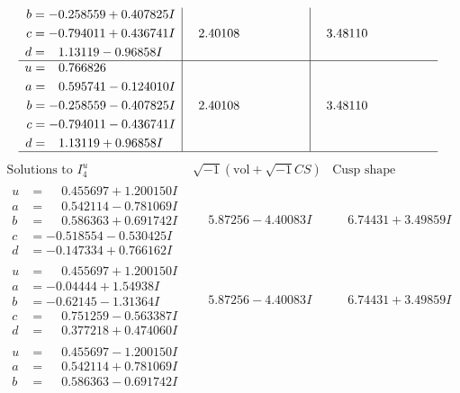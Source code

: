 \documentclass[1p]{elsarticle_modified}
\theoremstyle{definition}
\newcommand{\I}{\sqrt{-1}}
\begin{document}
$$\begin{array}{c|c|c}
\begin{aligned}
b &= -0.258559 + 0.407825 I \\
c &= -0.794011 + 0.436741 I \\
d &= \phantom{-}1.13119 - 0.96858 I\end{aligned}
 & \phantom{-}2.40108\phantom{ +0.000000I} & \phantom{-}3.48110\phantom{ +0.000000I} \\ \hline\begin{aligned}
u &= \phantom{-}0.766826\phantom{ +0.000000I} \\
a &= \phantom{-}0.595741 - 0.124010 I \\
b &= -0.258559 - 0.407825 I \\
c &= -0.794011 - 0.436741 I \\
d &= \phantom{-}1.13119 + 0.96858 I\end{aligned}
 & \phantom{-}2.40108\phantom{ +0.000000I} & \phantom{-}3.48110\phantom{ +0.000000I}\\
 \hline 
 \end{array}$$\newpage$$\begin{array}{c|c|c}  
\text{Solutions to }I^u_{4}& \I (\text{vol} + \sqrt{-1}CS) & \text{Cusp shape}\\
 \hline 
\begin{aligned}
u &= \phantom{-}0.455697 + 1.200150 I \\
a &= \phantom{-}0.542114 - 0.781069 I \\
b &= \phantom{-}0.586363 + 0.691742 I \\
c &= -0.518554 - 0.530425 I \\
d &= -0.147334 + 0.766162 I\end{aligned}
 & \phantom{-}5.87256 - 4.40083 I & \phantom{-}6.74431 + 3.49859 I \\ \hline\begin{aligned}
u &= \phantom{-}0.455697 + 1.200150 I \\
a &= -0.04444 + 1.54938 I \\
b &= -0.62145 - 1.31364 I \\
c &= \phantom{-}0.751259 - 0.563387 I \\
d &= \phantom{-}0.377218 + 0.474060 I\end{aligned}
 & \phantom{-}5.87256 - 4.40083 I & \phantom{-}6.74431 + 3.49859 I \\ \hline\begin{aligned}
u &= \phantom{-}0.455697 - 1.200150 I \\
a &= \phantom{-}0.542114 + 0.781069 I \\
b &= \phantom{-}0.586363 - 0.691742 I \\

\end{aligned}
\end{array}$$
\end{document}
